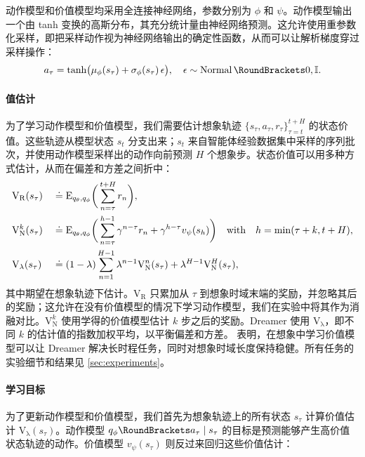 动作模型和价值模型均采用全连接神经网络，参数分别为 $\phi$ 和 $\psi$。动作模型输出一个由 tanh 变换的高斯分布\citep{haarnoja2018sac}，其充分统计量由神经网络预测。这允许使用重参数化采样\citep{kingma2013vae,rezende2014vae}，即把采样动作视为神经网络输出的确定性函数，从而可以让解析梯度穿过采样操作：
\begin{equation}
a_\tau=\operatorname{tanh}\!\big(\mu_\phi(s_\tau)+\sigma_\phi(s_\tau)\,\epsilon\big),
\quad\epsilon\sim\Normal(0,\I).
\end{equation}%

\paragraph{值估计}

为了学习动作模型和价值模型，我们需要估计想象轨迹 $\{s_\tau,a_\tau,r_\tau\}_{\tau=t}^{t+H}$ 的状态价值。这些轨迹从模型状态 $s_t$ 分支出来；$s_t$ 来自智能体经验数据集中采样的序列批次，并使用动作模型采样出的动作向前预测 $H$ 个想象步。状态价值可以用多种方式估计，从而在偏差和方差之间折中\citep{sutton2018rl}：
\begin{alignat}{3}
&\mathrm{V}_{\mathrm{R}}(s_\tau)&&\defined\E[\bigg]{q_\theta,q_\phi}{
 \sum_{n=\tau}^{t+H} r_n}, \\
&\mathrm{V}_{\mathrm{N}}^k(s_\tau)&&\defined\E[\bigg]{q_\theta,q_\phi}{
 \sum_{n=\tau}^{h-1} \gamma^{n-\tau}r_n
 +\gamma^{h-\tau} v_\psi(s_h)} \quad\text{with}\quad h=\min(\tau+k,t+H), \\
&\mathrm{V}_{\mathrm{\lambda}}(s_\tau)&&\defined
 (1-\lambda) \sum_{n=1}^{H-1} \lambda^{n-1} \mathrm{V}_{\mathrm{N}}^n(s_\tau) + \lambda^{H-1}\mathrm{V}_{\mathrm{N}}^H(s_\tau),
\label{eq:lambda_value}
\end{alignat}%
其中期望在想象轨迹下估计。$\mathrm{V}_{\mathrm{R}}$ 只累加从 $\tau$ 到想象时域末端的奖励，并忽略其后的奖励；这允许在没有价值模型的情况下学习动作模型，我们在实验中将其作为消融对比。$\mathrm{V}_{\mathrm{N}}^k$ 使用学得的价值模型估计 $k$ 步之后的奖励。Dreamer 使用 $\mathrm{V}_{\mathrm{\lambda}}$，即不同 $k$ 的估计值的指数加权平均，以平衡偏差和方差。 表明，在想象中学习价值模型可以让 Dreamer 解决长时程任务，同时对想象时域长度保持稳健。所有任务的实验细节和结果见 \cref{sec:experiments}。

\pagebreak

\paragraph{学习目标}

为了更新动作模型和价值模型，我们首先为想象轨迹上的所有状态 $s_\tau$ 计算价值估计 $\mathrm{V}_{\mathrm{\lambda}}(s_\tau)$。动作模型 $\pr[q_\phi](a_\tau|s_\tau)$ 的目标是预测能够产生高价值状态轨迹的动作。价值模型 $v_\psi(s_\tau)$ 则反过来回归这些价值估计：

